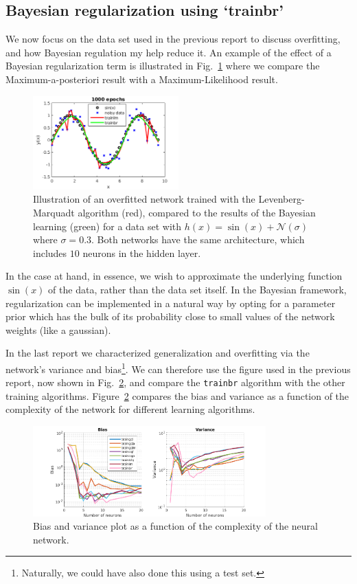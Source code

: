 \documentclass[pdftex,11pt,a4paper]{article}
\begin{document}
\subsection{Bayesian regularization using `trainbr'}
We now focus on the data set used in the previous report to discuss overfitting, and how Bayesian regulation my help reduce it.  An example of the effect of a Bayesian regularization term is illustrated in Fig.~\ref{fig:overfitting_example} where we compare the Maximum-a-posteriori result with a Maximum-Likelihood result.
\begin{figure}[htb]
\centering
\includegraphics[width=0.5\textwidth]{figs/overfitting_example.png}
\caption{Illustration of an overfitted network trained with the Levenberg-Marquadt algorithm (red), compared to the results of the Bayesian learning (green) for a data set with $h(x)=\sin(x) + \mathcal{N}(\sigma)$ where $\sigma = 0.3$. Both networks have the same architecture, which includes $10$ neurons in the hidden layer.\label{fig:overfitting_example}}
\end{figure}
In the case at hand, in essence, we wish to approximate the underlying function $\sin(x)$ of the data, rather than the data set itself. In the Bayesian framework, regularization can be implemented in a natural way by opting for a parameter prior which has the bulk of its probability close to small values of the network weights (like a gaussian). 

In the last report we characterized generalization and overfitting via the network's variance and bias\footnote{Naturally, we could have also done this using a test set.}. We can therefore use the figure used in the previous report, now shown in Fig.~\ref{fig:bias_and_variance_plot}, and compare the \texttt{trainbr} algorithm with the other training algorithms. Figure~\ref{fig:bias_and_variance_plot} compares the bias and variance as a function of the complexity of the network for different learning algorithms.
 
\begin{figure}[hbt]
\centering
\includegraphics[width=0.8\textwidth]{figs/bias_and_variance.png}
\caption{Bias and variance plot as a function of the complexity of the neural network.\label{fig:bias_and_variance_plot}}
\end{figure}
\end{document}
